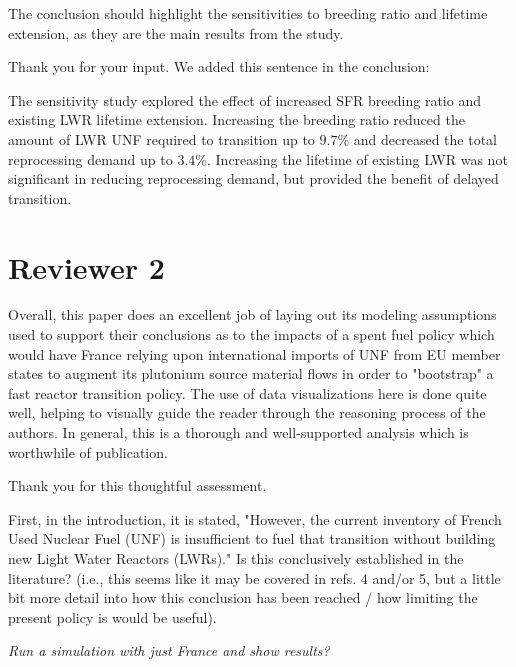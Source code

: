 \documentclass[answers,11pt]{exam}
\begin{document}
\begin{questions}
        \question The conclusion should highlight the sensitivities to breeding 
        ratio and lifetime extension, as they are the main results from the 
        study.  

        \begin{solution}
                Thank you for your input. We added this sentence in the conclusion:
                
                The sensitivity study explored the effect of increased SFR breeding
                ratio and existing LWR lifetime extension. Increasing the breeding
                ratio reduced the amount of LWR UNF required to transition
                up to $9.7\%$ and decreased the total reprocessing demand up to $3.4\%$.
                Increasing the lifetime of existing LWR was not significant
                in reducing reprocessing demand, but provided the benefit of delayed
                transition.
        \end{solution}


        \section*{Reviewer 2}


        \question Overall, this paper does an excellent job of laying out its 
        modeling assumptions used to support their conclusions as to the 
        impacts of a spent fuel policy which would have France relying upon 
        international imports of UNF from EU member states to augment its 
        plutonium source material flows in order to "bootstrap" a fast reactor 
        transition policy. The use of data visualizations here is done quite 
        well, helping to visually guide the reader through the reasoning 
        process of the authors. In general, this is a thorough and 
        well-supported analysis which is worthwhile of publication.


        \begin{solution}
                Thank you for this thoughtful assessment.
        \end{solution}

        \question First, in the introduction, it is stated, "However, the 
        current inventory of French Used Nuclear Fuel (UNF) is insufficient to 
        fuel that transition without building new Light Water Reactors (LWRs)." 
        Is this conclusively established in the literature? (i.e., this seems 
        like it may be covered in refs. 4 and/or 5, but a little bit more 
        detail into how this conclusion has been reached / how limiting the 
        present policy is would be useful).
        \begin{solution}
                \textit{Run a simulation with just France and show results?}
                

\end{solution}
\end{questions}
\end{document}
